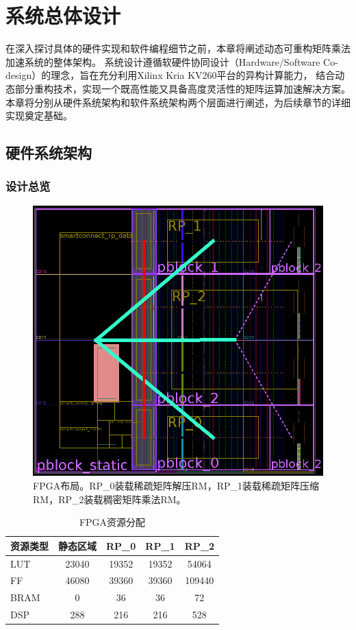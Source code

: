 \chapter{系统总体设计}

在深入探讨具体的硬件实现和软件编程细节之前，本章将阐述动态可重构矩阵乘法加速系统的整体架构。
系统设计遵循软硬件协同设计（Hardware/Software Co-design）的理念，旨在充分利用Xilinx Kria KV260平台的异构计算能力，
结合动态部分重构技术，实现一个既高性能又具备高度灵活性的矩阵运算加速解决方案。
本章将分别从硬件系统架构和软件系统架构两个层面进行阐述，为后续章节的详细实现奠定基础。

\section{硬件系统架构}

\subsection{设计总览}

\begin{figure}[htbp]
\centerline{\includegraphics[width=0.8\columnwidth]{figures/synth.png}}
\caption{FPGA布局。RP\_0装载稀疏矩阵解压RM，RP\_1装载稀疏矩阵压缩RM，RP\_2装载稠密矩阵乘法RM。}
\label{fig:synth}
\end{figure}

\begin{table}[htbp]
\caption{FPGA资源分配}
\centering
\begin{tabular}{|l|c|c|c|c|}
\hline
\textbf{资源类型} & \textbf{静态区域} & \textbf{RP\_0} & \textbf{RP\_1} & \textbf{RP\_2}\\ \hline
LUT & 23040 & 19352 & 19352 & 54064 \\ \hline
FF & 46080 & 39360 & 39360 & 109440 \\ \hline
BRAM & 0 & 36 & 36 & 72 \\ \hline
DSP & 288 & 216 & 216 & 528 \\ \hline
\end{tabular}
\label{tab:resources}
\end{table}

